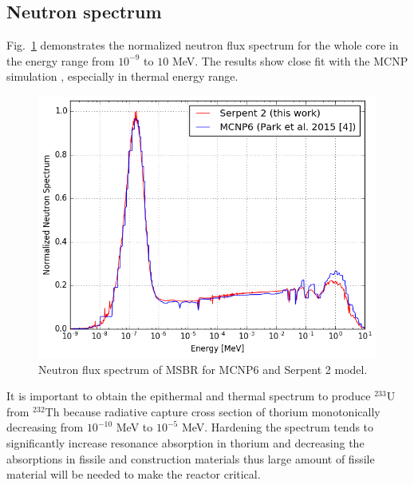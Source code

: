 \documentclass{anstrans}
\begin{document}
\subsection{Neutron spectrum}
Fig.~\ref{fig:spectrum} demonstrates the normalized neutron flux spectrum for the whole core in the energy range from $10^{-9}$ to $10$ MeV. The results show close fit with the MCNP simulation \cite{park_whole_2015}, especially in thermal energy range. 
\begin{figure}[h!] %
  \centering
  \includegraphics[width=1.05\linewidth]{figure_3_1.png} 
  \caption{Neutron flux spectrum of \gls{MSBR} for MCNP6 and Serpent 2 model.}
  \label{fig:spectrum}
\end{figure}
It is important to obtain the epithermal and thermal spectrum to produce $^{233}$U from $^{232}$Th because radiative capture cross section of thorium monotonically decreasing from $10^{-10}$ MeV to $10^{-5}$ MeV. Hardening the spectrum tends to significantly increase resonance absorption in thorium and decreasing the absorptions in fissile and construction materials thus large amount of fissile material will be needed to make the reactor critical.
\end{document}
